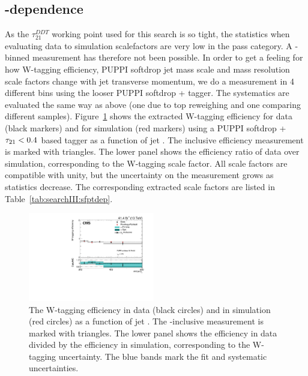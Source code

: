\subsection{\PT-dependence}
As the $\tau_{21}^{DDT}$ working point used for this search is so tight, the statistics when evaluating data to simulation scalefactors are very low in the pass category. A \PT-binned measurement has therefore not been possible. In order to get a feeling for how W-tagging efficiency, PUPPI softdrop jet mass scale and mass resolution scale factors change with jet transverse momentum, we do a measurement in 4 different \PT bins using the looser PUPPI softdrop + \nsubj tagger. The systematics are evaluated the same way as above (one due to top \PT reweighing and one comparing different \ttbar samples). Figure~\ref{fig:searchIII:sfvspt} shows the extracted W-tagging efficiency for data (black markers) and for simulation (red markers) using a PUPPI softdrop + $\tau_{21}<0.4$ based tagger as a function of jet \PT. The inclusive efficiency measurement is marked with triangles. The lower panel shows the efficiency ratio of data over simulation, corresponding to the W-tagging scale factor. All scale factors are compatible with unity, but the uncertainty on the measurement grows as statistics decrease. The corresponding extracted scale factors are listed in Table~\ref{tab:searchIII:sfptdep}.
 \begin{figure}[h!]
 \centering
 \includegraphics[width=0.49\textwidth]{figures/vtagging/2017_sf/sd_vPt.pdf}
 \caption{The W-tagging efficiency in data (black circles) and in simulation (red circles) as a function of jet \PT. The \PT-inclusive measurement is marked with triangles. The lower panel shows the efficiency in data divided by the efficiency in simulation, corresponding to the W-tagging uncertainty. The blue bands mark the fit and systematic uncertainties.}
 \label{fig:searchIII:sfvspt}
 \end{figure}
